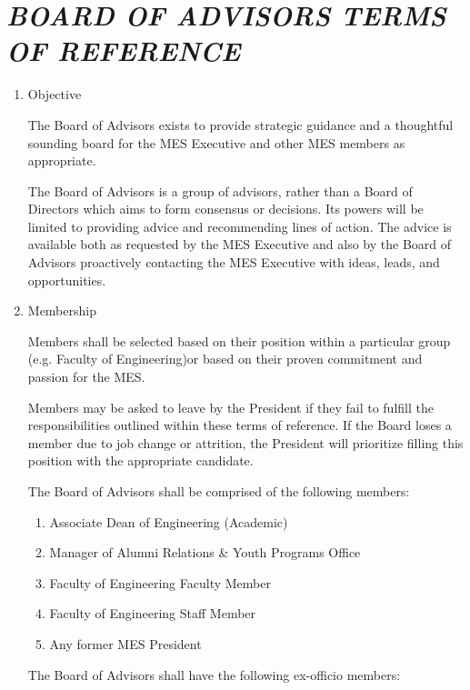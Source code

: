  \section{\texorpdfstring{\emph{BOARD OF ADVISORS TERMS OF
     REFERENCE}}{BOARD OF ADVISORS TERMS OF REFERENCE}}
\label{board-of-advisors-terms-of-reference}

\begin{enumerate}
 \item
  Objective

  The Board of Advisors exists to provide strategic guidance and a
  thoughtful sounding board for the MES Executive and other MES members as
  appropriate.

  The Board of Advisors is a group of advisors, rather than a Board of
  Directors which aims to form consensus or decisions. Its powers will be
  limited to providing advice and recommending lines of action. The advice
  is available both as requested by the MES Executive and also by the
  Board of Advisors proactively contacting the MES Executive with ideas,
  leads, and opportunities.

 \item
  Membership

  Members shall be selected based on their position within a particular
  group (e.g. Faculty of Engineering)or based on their proven commitment
  and passion for the MES.

  Members may be asked to leave by the President if they fail to fulfill
  the responsibilities outlined within these terms of reference. If the
  Board loses a member due to job change or attrition, the President will
  prioritize filling this position with the appropriate candidate.

  The Board of Advisors shall be comprised of the following members:

  \begin{enumerate}
   \item
    Associate Dean of Engineering (Academic)
   \item
    Manager of Alumni Relations \& Youth Programs Office
   \item
    Faculty of Engineering Faculty Member
   \item
    Faculty of Engineering Staff Member
   \item
    Any former MES President
  \end{enumerate}

  The Board of Advisors shall have the following ex-officio members:


\end{enumerate}
